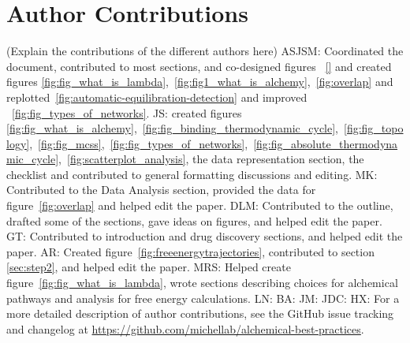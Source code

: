 \documentclass[9pt,bestpractices]{livecoms}
\newcommand{\githubrepository}{\url{https://github.com/michellab/alchemical-best-practices}}  %
\begin{document}

\clearpage

\clearpage

\section*{Author Contributions}
%
(Explain the contributions of the different authors here)
ASJSM: Coordinated the document, contributed to most sections, and co-designed figures ~\ref{} and created figures \ref{fig:fig_what_is_lambda},~\ref{fig:fig1_what_is_alchemy},~\ref{fig:overlap} and replotted~\ref{fig:automatic-equilibration-detection} and improved ~\ref{fig:fig_types_of_networks}.
JS: created figures \ref{fig:fig_what_is_alchemy},~\ref{fig:fig_binding_thermodynamic_cycle},~\ref{fig:fig_topology},~\ref{fig:fig_mcss},~\ref{fig:fig_types_of_networks},~\ref{fig:fig_absolute_thermodynamic_cycle},~\ref{fig:scatterplot_analysis}, the data representation section, the checklist and contributed to general formatting discussions and editing.
MK: Contributed to the Data Analysis section, provided the data for figure~\ref{fig:overlap} and helped edit the paper.
DLM: Contributed to the outline, drafted some of the sections, gave ideas on figures, and helped edit the paper.
GT: Contributed to introduction and drug discovery sections, and helped edit the paper.
AR: Created figure~\ref{fig:freeenergytrajectories}, contributed to section \ref{sec:step2}, and helped edit the paper.
MRS: Helped create figure~\ref{fig:fig_what_is_lambda}, wrote sections describing choices for alchemical pathways and analysis for free energy calculations.
LN: 
BA: 
JM: 
JDC: 
HX: 
For a more detailed description of author contributions,
see the GitHub issue tracking and changelog at \githubrepository.
\end{document}
